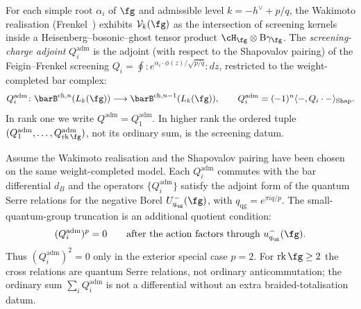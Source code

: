 \begin{definition}
\label{def:screening-adjoint}
For each simple root $\alpha_i$ of $\fg$ and admissible level
$k = -h^\vee + p/q$, the Wakimoto realisation
\textup{(}Frenkel~\cite{Fre07}\textup{)} exhibits
$\mathcal{V}_k(\fg)$ as the intersection of screening kernels
inside a Heisenberg--bosonic--ghost tensor product
$\cH_{\fg} \otimes \mathrm{B}\gamma_{\fg}$.
The \emph{screening-charge adjoint} $Q_i^{\mathrm{adm}}$ is the
adjoint \textup{(}with respect to the Shapovalov pairing\textup{)} of
the Feigin--Frenkel screening
$Q_i = \oint :e^{\alpha_i \cdot \phi(z)/\sqrt{p/q}}: dz$,
restricted to the weight-completed bar complex:
\begin{equation}\label{eq:screening-adjoint}
Q_i^{\mathrm{adm}}\colon
\barB^{\mathrm{ch},n}(L_k(\fg))
\longrightarrow
\barB^{\mathrm{ch},n-1}(L_k(\fg)),
\qquad
Q_i^{\mathrm{adm}}
= (-1)^n \langle -, Q_i \cdot - \rangle_{\mathrm{Shap}}.
\end{equation}
In rank one we write $Q^{\mathrm{adm}}=Q_1^{\mathrm{adm}}$.  In
higher rank the ordered tuple
$(Q_1^{\mathrm{adm}},\ldots,Q_{\mathrm{rk}\,\fg}^{\mathrm{adm}})$,
not its ordinary sum, is the screening datum.
\end{definition}

\begin{lemma}
\label{lem:screening-adjoint-squares}
Assume the Wakimoto realisation and the Shapovalov pairing have been
chosen on the same weight-completed model.  Each
$Q_i^{\mathrm{adm}}$ commutes with the bar differential $d_B$ and the
operators $\{Q_i^{\mathrm{adm}}\}$ satisfy the adjoint form of the
quantum Serre relations for the negative Borel
$U_{q_{\mathrm{qg}}}^-(\fg)$, with
$q_{\mathrm{qg}}=e^{\pi i q/p}$.  The small-quantum-group truncation
is an additional quotient condition:
\[
(Q_i^{\mathrm{adm}})^p=0
\qquad
\text{after the action factors through }u_{q_{\mathrm{qg}}}^-(\fg).
\]
Thus $(Q_i^{\mathrm{adm}})^2=0$ only in the exterior special case
$p=2$.  For $\mathrm{rk}\,\fg\geq2$ the cross relations are quantum
Serre relations, not ordinary anticommutation; the ordinary sum
$\sum_i Q_i^{\mathrm{adm}}$ is not a differential without an extra
braided-totalisation datum.
\end{lemma}

